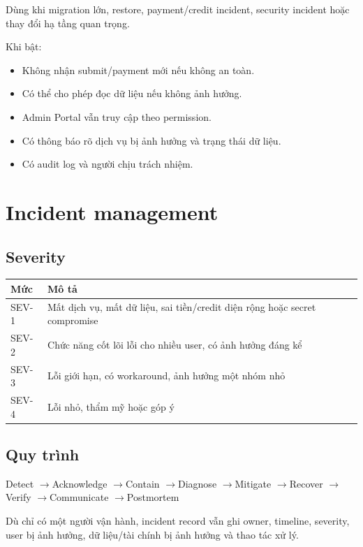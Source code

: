 \documentclass[11pt,a4paper]{article}
\newcommand{\arrow}{\ensuremath{\rightarrow}}
\begin{document}
Dùng khi migration lớn, restore, payment/credit incident, security incident hoặc thay đổi hạ tầng quan trọng.

Khi bật:

\begin{itemize}
  \item Không nhận submit/payment mới nếu không an toàn.
  \item Có thể cho phép đọc dữ liệu nếu không ảnh hưởng.
  \item Admin Portal vẫn truy cập theo permission.
  \item Có thông báo rõ dịch vụ bị ảnh hưởng và trạng thái dữ liệu.
  \item Có audit log và người chịu trách nhiệm.
\end{itemize}

\section{Incident management}

\subsection{Severity}

\begin{longtable}{L{0.14\textwidth}L{0.78\textwidth}}
\toprule
\textbf{Mức} & \textbf{Mô tả} \\
\midrule
SEV-1 & Mất dịch vụ, mất dữ liệu, sai tiền/credit diện rộng hoặc secret compromise \\
SEV-2 & Chức năng cốt lõi lỗi cho nhiều user, có ảnh hưởng đáng kể \\
SEV-3 & Lỗi giới hạn, có workaround, ảnh hưởng một nhóm nhỏ \\
SEV-4 & Lỗi nhỏ, thẩm mỹ hoặc góp ý \\
\bottomrule
\end{longtable}

\subsection{Quy trình}

\begin{flowbox}
Detect \arrow Acknowledge \arrow Contain \arrow Diagnose \arrow Mitigate \arrow Recover \arrow Verify \arrow Communicate \arrow Postmortem
\end{flowbox}

Dù chỉ có một người vận hành, incident record vẫn ghi owner, timeline, severity, user bị ảnh hưởng, dữ liệu/tài chính bị ảnh hưởng và thao tác xử lý.
\end{document}
